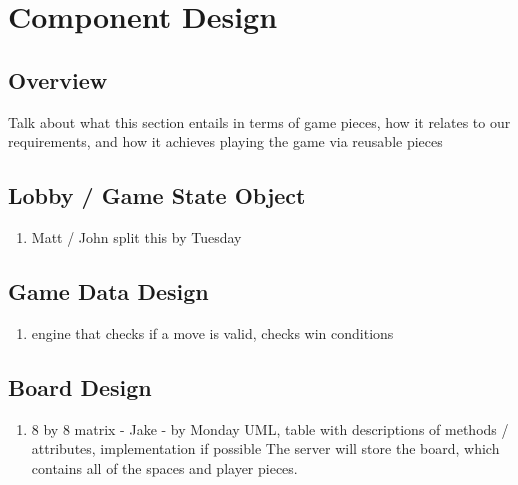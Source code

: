 \documentclass{scrreprt}
\begin{document}
\chapter{Component Design}
	\section{Overview}
	Talk about what this section entails in terms of game pieces, how it relates to our requirements, and how it achieves playing the game via reusable pieces

	\section{Lobby / Game State Object}
		\begin{enumerate} [label*=\arabic*.]
		\item Matt / John split this by Tuesday
		\end{enumerate}
	\section{Game Data Design}
\begin{enumerate} [label*=\arabic*.]
		\item engine that checks if a move is valid, checks win conditions
\end{enumerate}
	\section{Board Design}
\begin{enumerate} [label*=\arabic*.]
		\item 8 by 8 matrix - Jake - by Monday 
		UML, table with descriptions of methods / attributes, implementation if possible 
		The server will store the board, which contains all of the spaces and player pieces.
\end{enumerate}
\end{document}
